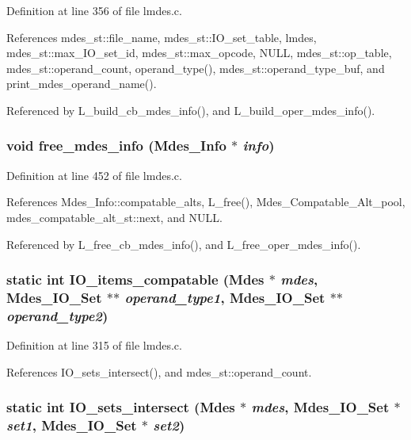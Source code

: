 Definition at line 356 of file lmdes.c.

References mdes\_\-st::file\_\-name, mdes\_\-st::IO\_\-set\_\-table, lmdes, mdes\_\-st::max\_\-IO\_\-set\_\-id, mdes\_\-st::max\_\-opcode, NULL, mdes\_\-st::op\_\-table, mdes\_\-st::operand\_\-count, operand\_\-type(), mdes\_\-st::operand\_\-type\_\-buf, and print\_\-mdes\_\-operand\_\-name().

Referenced by L\_\-build\_\-cb\_\-mdes\_\-info(), and L\_\-build\_\-oper\_\-mdes\_\-info().
\subsubsection{\setlength{\rightskip}{0pt plus 5cm}void free\_\-mdes\_\-info (\bf{Mdes\_\-Info} $\ast$ {\em info})}\label{lmdes_8c_3e2b7abcf414fa5c31b177b5fa743192}




Definition at line 452 of file lmdes.c.

References Mdes\_\-Info::compatable\_\-alts, L\_\-free(), Mdes\_\-Compatable\_\-Alt\_\-pool, mdes\_\-compatable\_\-alt\_\-st::next, and NULL.

Referenced by L\_\-free\_\-cb\_\-mdes\_\-info(), and L\_\-free\_\-oper\_\-mdes\_\-info().
\subsubsection{\setlength{\rightskip}{0pt plus 5cm}static int IO\_\-items\_\-compatable (\bf{Mdes} $\ast$ {\em mdes}, \bf{Mdes\_\-IO\_\-Set} $\ast$$\ast$ {\em operand\_\-type1}, \bf{Mdes\_\-IO\_\-Set} $\ast$$\ast$ {\em operand\_\-type2})\hspace{0.3cm}{\tt  [static]}}\label{lmdes_8c_6c57cbcf8f540277cc5af9715a3ab7d2}




Definition at line 315 of file lmdes.c.

References IO\_\-sets\_\-intersect(), and mdes\_\-st::operand\_\-count.
\subsubsection{\setlength{\rightskip}{0pt plus 5cm}static int IO\_\-sets\_\-intersect (\bf{Mdes} $\ast$ {\em mdes}, \bf{Mdes\_\-IO\_\-Set} $\ast$ {\em set1}, \bf{Mdes\_\-IO\_\-Set} $\ast$ {\em set2})\hspace{0.3cm}{\tt  [static]}}\label{lmdes_8c_6b8141e6178783fa24c3f14577e7a28b}




